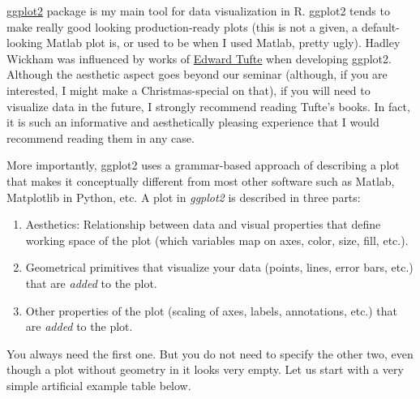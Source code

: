\documentclass[
]{book}
\providecommand{\tightlist}{%
  \setlength{\itemsep}{0pt}\setlength{\parskip}{0pt}}
\begin{document}
\href{https://ggplot2.tidyverse.org/}{ggplot2} package is my main tool for data visualization in R. ggplot2 tends to make really good looking production-ready plots (this is not a given, a default-looking Matlab plot is, or used to be when I used Matlab, pretty ugly). Hadley Wickham was influenced by works of \href{https://www.edwardtufte.com/tufte/}{Edward Tufte} when developing ggplot2. Although the aesthetic aspect goes beyond our seminar (although, if you are interested, I might make a Christmas-special on that), if you will need to visualize data in the future, I strongly recommend reading Tufte's books. In fact, it is such an informative and aesthetically pleasing experience that I would recommend reading them in any case.

More importantly, ggplot2 uses a grammar-based approach of describing a plot that makes it conceptually different from most other software such as Matlab, Matplotlib in Python, etc. A plot in \emph{ggplot2} is described in three parts:

\begin{enumerate}
\def\labelenumi{\arabic{enumi}.}
\tightlist
\item
  Aesthetics: Relationship between data and visual properties that define working space of the plot (which variables map on axes, color, size, fill, etc.).
\item
  Geometrical primitives that visualize your data (points, lines, error bars, etc.) that are \emph{added} to the plot.
\item
  Other properties of the plot (scaling of axes, labels, annotations, etc.) that are \emph{added} to the plot.
\end{enumerate}

You always need the first one. But you do not need to specify the other two, even though a plot without geometry in it looks very empty. Let us start with a very simple artificial example table below.
\end{document}
